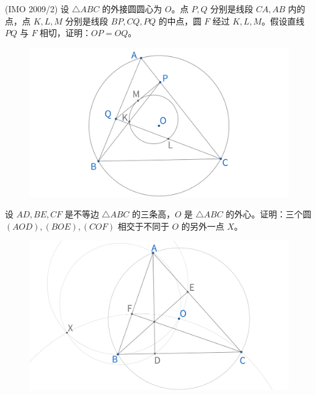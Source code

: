 \newpage 
\begin{exercise}
    (IMO 2009/2) 设 $\triangle ABC$ 的外接圆圆心为 $O$。点 $P, Q$ 分别是线段 ${CA}, {AB}$ 内的点，点 $K, L, M$ 分别是线段 $BP, CQ, PQ$ 的中点，圆 $F$ 经过 $K, L, M$。假设直线 $PQ$ 与 $F$ 相切，证明：$OP = OQ$。
\end{exercise}
\begin{figure}[H]
    \centering
    \includegraphics[width=0.7\linewidth]{figures/exercises/235.png}
\end{figure}


\begin{exercise}
设 $AD, BE, CF$ 是不等边 $\triangle ABC$ 的三条高，$O$ 是 $\triangle ABC$ 的外心。证明：三个圆 $(AOD), (BOE), (COF)$ 相交于不同于 $O$ 的另外一点 $X$。
\end{exercise}
\begin{figure}[H]
    \centering
    \includegraphics[width=0.7\linewidth]{figures/exercises/236.png}
\end{figure}


